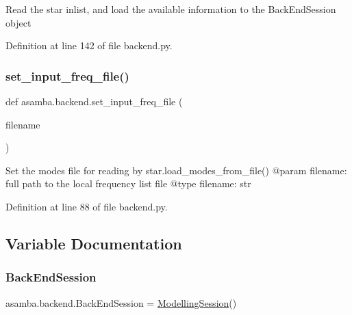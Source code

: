 \begin{DoxyVerb}Read the star inlist, and load the available information to the BackEndSession object
\end{DoxyVerb}
 

Definition at line 142 of file backend.\+py.

\mbox{\label{namespaceasamba_1_1backend_a6312398e26ae20a0e2ca43fb80866328}} 
\subsubsection{\texorpdfstring{set\+\_\+input\+\_\+freq\+\_\+file()}{set\_input\_freq\_file()}}
{\footnotesize\ttfamily def asamba.\+backend.\+set\+\_\+input\+\_\+freq\+\_\+file (\begin{DoxyParamCaption}\item[{}]{filename }\end{DoxyParamCaption})}

\begin{DoxyVerb}Set the modes file for reading by star.load_modes_from_file()
@param filename: full path to the local frequency list file
@type filename: str
\end{DoxyVerb}
 

Definition at line 88 of file backend.\+py.



\subsection{Variable Documentation}
\mbox{\label{namespaceasamba_1_1backend_afd7e436e1e620c4ee06153ef5817ad7e}} 
\subsubsection{\texorpdfstring{Back\+End\+Session}{BackEndSession}}
{\footnotesize\ttfamily asamba.\+backend.\+Back\+End\+Session = \hyperlink{classasamba_1_1backend_1_1_modelling_session}{Modelling\+Session}()}



